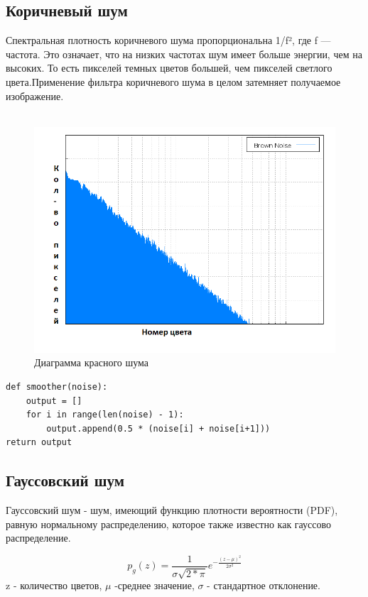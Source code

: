 \subsection{Коричневый шум}
Спектральная плотность коричневого шума пропорциональна 1/f², где f — частота.																									
Это означает, что на низких частотах шум имеет больше энергии, чем на высоких. То есть пикселей темных цветов большей, чем пикселей светлого цвета.Применение фильтра коричневого шума в целом затемняет получаемое изображение.
\\\
\begin{figure}[h]
	\centering
	\includegraphics[width=\textwidth ]{img/6_brown_noise.png}
	\caption{Диаграмма красного шума }
	\label{fig:spire04}
\end{figure} 
\begin{lstlisting}[style=pseudocode,caption={Получение коричневого шума}] 
def smoother(noise):
    output = []
    for i in range(len(noise) - 1):
        output.append(0.5 * (noise[i] + noise[i+1]))
return output
\end{lstlisting}

\subsection{Гауссовский шум}

Гауссовский шум  - шум, имеющий функцию плотности вероятности (PDF), равную нормальному распределению, которое также известно как гауссово распределение. 

\begin{equation}
p_g(z)=\frac{1}{\sigma\sqrt{2*\pi}}e^{-\frac{(z-\mu)^2}{2\sigma^2}}
\end{equation}
z - количество цветов, $\mu$ -среднее значение, $\sigma$ - стандартное отклонение.
